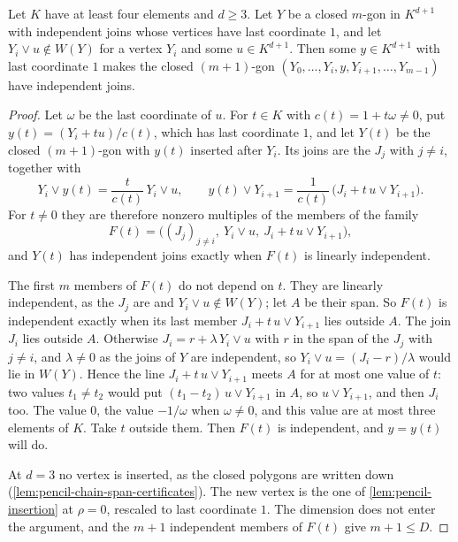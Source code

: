\begin{lemma}
  \label{lem:pencil-d-polygon-insert}
  \leanok
  Let $K$ have at least four elements and $d \ge 3$. Let $Y$ be a closed
  $m$-gon in $K^{d+1}$ with independent joins whose vertices have last
  coordinate $1$, and let $Y_i \vee u \notin W(Y)$ for a vertex $Y_i$ and
  some $u \in K^{d+1}$. Then some $y \in K^{d+1}$ with last coordinate
  $1$ makes the closed $(m + 1)$-gon
  $(Y_0, \dots, Y_i, y, Y_{i+1}, \dots, Y_{m-1})$ have independent
  joins.
\end{lemma}
\begin{proof}
  \leanok
  Let $\omega$ be the last coordinate of $u$. For $t \in K$ with
  $c(t) = 1 + t\omega \neq 0$, put $y(t) = (Y_i + t u)/c(t)$, which has
  last coordinate $1$, and let $Y(t)$ be the closed $(m + 1)$-gon with
  $y(t)$ inserted after $Y_i$. Its joins are the $J_j$ with $j \neq i$,
  together with
  \[
    Y_i \vee y(t) = \frac{t}{c(t)}\, Y_i \vee u, \qquad
    y(t) \vee Y_{i+1} = \frac{1}{c(t)}\,
    \bigl(J_i + t\, u \vee Y_{i+1}\bigr).
  \]
  For $t \neq 0$ they are therefore nonzero multiples of the members of
  the family
  \[
    F(t) = \bigl((J_j)_{j \neq i},\ Y_i \vee u,\
    J_i + t\, u \vee Y_{i+1}\bigr),
  \]
  and $Y(t)$ has independent joins exactly when $F(t)$ is linearly
  independent.

  The first $m$ members of $F(t)$ do not depend on $t$. They are
  linearly independent, as the $J_j$ are and $Y_i \vee u \notin W(Y)$;
  let $A$ be their span. So $F(t)$ is independent exactly when its last
  member $J_i + t\, u \vee Y_{i+1}$ lies outside $A$. The join $J_i$ lies
  outside $A$. Otherwise $J_i = r + \lambda\, Y_i \vee u$ with $r$ in the
  span of the $J_j$ with $j \neq i$, and $\lambda \neq 0$ as the joins of
  $Y$ are independent, so $Y_i \vee u = (J_i - r)/\lambda$ would lie in
  $W(Y)$. Hence the line $J_i + t\, u \vee Y_{i+1}$ meets $A$ for at most
  one value of $t$: two values $t_1 \neq t_2$ would put
  $(t_1 - t_2)\, u \vee Y_{i+1}$ in $A$, so $u \vee Y_{i+1}$, and then
  $J_i$ too. The value $0$, the value $-1/\omega$ when $\omega \neq 0$,
  and this value are at most three elements of $K$. Take $t$ outside
  them. Then $F(t)$ is independent, and $y = y(t)$ will do.

  At $d = 3$ no vertex is inserted, as the closed polygons are written
  down (\cref{lem:pencil-chain-span-certificates}). The new vertex is
  the one of \cref{lem:pencil-insertion} at $\rho = 0$, rescaled to last
  coordinate $1$. The dimension does not enter the argument, and the
  $m + 1$ independent members of $F(t)$ give $m + 1 \le D$.
\end{proof}

